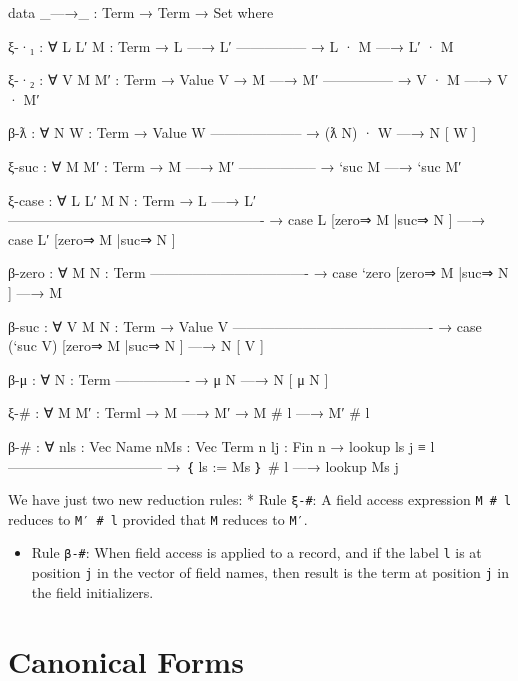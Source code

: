 \begin{fence}
\begin{code}
data _—→_ : Term → Term → Set where

  ξ-·₁ : ∀ {L L′ M : Term}
    → L —→ L′
      ---------------
    → L · M —→ L′ · M

  ξ-·₂ : ∀ {V  M M′ : Term}
    → Value V
    → M —→ M′
      ---------------
    → V · M —→ V · M′

  β-ƛ : ∀ {N W : Term}
    → Value W
      --------------------
    → (ƛ N) · W —→ N [ W ]

  ξ-suc : ∀ {M M′ : Term}
    → M —→ M′
      -----------------
    → `suc M —→ `suc M′

  ξ-case : ∀ {L L′ M N : Term}
    → L —→ L′
      -------------------------------------------------------
    → case L [zero⇒ M |suc⇒ N ] —→ case L′ [zero⇒ M |suc⇒ N ]

  β-zero :  ∀ {M N : Term}
      ----------------------------------
    → case `zero [zero⇒ M |suc⇒ N ] —→ M

  β-suc : ∀ {V M N : Term}
    → Value V
      -------------------------------------------
    → case (`suc V) [zero⇒ M |suc⇒ N ] —→ N [ V ]

  β-μ : ∀ {N : Term}
      ----------------
    → μ N —→ N [ μ N ]

  ξ-# : ∀ {M M′ : Term}{l}
    → M —→ M′
    → M # l —→ M′ # l

  β-# : ∀ {n}{ls : Vec Name n}{Ms : Vec Term n} {l}{j : Fin n}
    → lookup ls j ≡ l
      ---------------------------------
    → ｛ ls := Ms ｝ # l —→  lookup Ms j
\end{code}
\end{fence}

We have just two new reduction rules: * Rule \texttt{ξ-\#}: A field
access expression \texttt{M\ \#\ l} reduces to \texttt{M′\ \#\ l}
provided that \texttt{M} reduces to \texttt{M′}.

\begin{itemize}
\tightlist
\item
  Rule \texttt{β-\#}: When field access is applied to a record, and if
  the label \texttt{l} is at position \texttt{j} in the vector of field
  names, then result is the term at position \texttt{j} in the field
  initializers.
\end{itemize}

\hypertarget{canonical-forms}{%
\section{Canonical Forms}\label{canonical-forms}}

